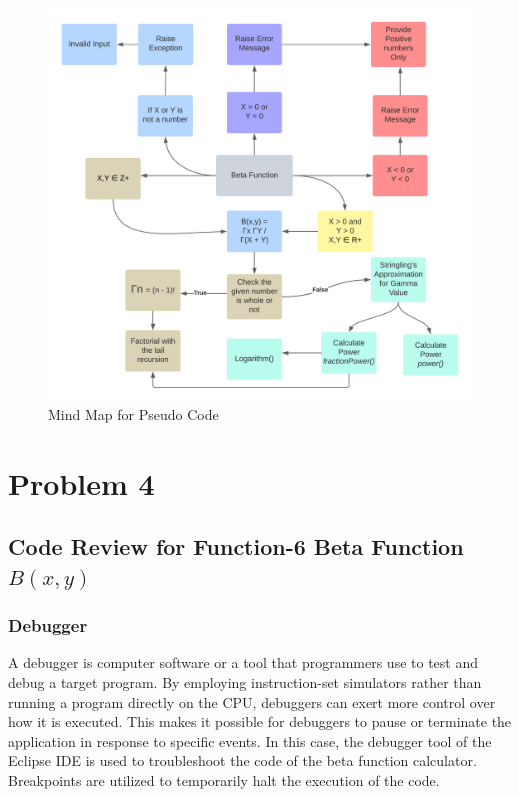\documentclass[12pt,a4paper]{report}
\begin{document}
\begin{figure}[h]
    \centering
    \begin{center}
    \includegraphics[width=1.0\linewidth]{Images/Mind-Map.png}    
    \end{center}
    \caption{Mind Map for Pseudo Code}
    \label{fig:Mind Map}
\end{figure}

\newpage

\chapter{Problem 4}

\section{Code Review for Function-6 Beta Function $B(x,y)$}
\subsection{Debugger}
A debugger is computer software or a tool that programmers use to test and debug a target program. By employing instruction-set simulators rather than running a program directly on the CPU, debuggers can exert more control over how it is executed. This makes it possible for debuggers to pause or terminate the application in response to specific events. In this case, the debugger tool of the Eclipse IDE is used to troubleshoot the code of the beta function calculator. Breakpoints are utilized to temporarily halt the execution of the code. \\
\end{document}
